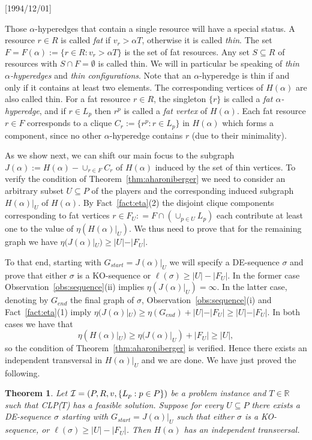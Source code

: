 \NeedsTeXFormat{LaTeX2e}[1994/12/01]\documentclass[letterpaper, 11pt]{article}
\newtheorem{thm}{Theorem}[section]
\theoremstyle{definition}
\theoremstyle{remark}
\numberwithin{equation}{section}
\begin{document}
Those $\alpha$-hyperedges that contain a single resource will have a special status. 
A resource $r\in R$ is called {\em fat} if $v_r >
\alpha T$, otherwise it is called {\em thin}.
The set $F = F(\alpha) := \{ r\in R: v_r > \alpha T \}$ is the set of
fat resources. Any set $S\subseteq R$ of resources with $S\cap F =
\emptyset$ is called thin. We will in particular be speaking of {\em thin
  $\alpha$-hyperedges} and {\em thin configurations}.
Note that an $\alpha$-hyperedge is thin if and only if it contains at
least two elements. The corresponding vertices
of $H(\alpha)$ are also called thin. 
For a fat resource $r\in R$, the singleton $\{ r \}$ is called a {\em fat
$\alpha$-hyperedge}, and if $r\in L_p$ then 
$r^p$ is called a {\em fat vertex} of $H(\alpha)$. 
Each fat resource $r\in F$ corresponds to a clique $C_r :=
\{ r^p : r\in L_p \}$ in  $H(\alpha)$ which forms a component, since no other
$\alpha$-hyperedge contains $r$ (due to their minimality).

As we show next, we can shift our main focus to the subgraph
$J(\alpha) := H(\alpha)- \cup_{r\in F} C_r$ of $H(\alpha)$
induced by the set of thin vertices.  
To verify the condition  of Theorem~\ref{thm:aharoniberger} we need to
consider an arbitrary subset $U\subseteq P$ of the players and 
the corresponding induced subgraph $H(\alpha)|_U$ of $H(\alpha)$.
By Fact~\ref{fact:eta}(2) the disjoint clique components corresponding to fat
vertices $r\in F_U : = F\cap (\cup_{p\in U} L_p)$ each contribute at least one to the
value of $\eta(H(\alpha)|_U)$. 
We thus need to prove that for the remaining
graph we have $\eta (J(\alpha)|_U) \geq |U|-|F_U|$.

To that end, starting with $G_{start}=J(\alpha)|_U$ we will specify a 
DE-sequence $\sigma$ and prove that either $\sigma$ is a KO-sequence
or $\ell(\sigma) \ge |U|-|F_U|$. In the former case
Observation~\ref{obs:sequence}(ii) implies
$\eta (J(\alpha)|_U) = \infty$. In the latter case, denoting by $G_{end}$ the final graph of $\sigma$,  Observation~\ref{obs:sequence}(i) and Fact~\ref{fact:eta}(1) imply
$\eta (J(\alpha)|_U) \geq \eta(G_{end}) + |U|-|F_U| \geq |U|-|F_U|$.
In both cases we have that $$\eta(H(\alpha)|_U) \geq \eta (J(\alpha)|_U)
+ |F_U| \geq |U|,$$
so the condition of Theorem~\ref{thm:aharoniberger}
is verified. Hence there exists an independent transversal in
$H(\alpha)|_U$ and we are done.
We have just proved the following.
\begin{thm}\label{thm:diet}
  Let ${\cal I} = ( P ,R, v, \{ L_p: p\in P \})$ be a problem instance
  and $T \in \mathbb{R}$ such that CLP($T$) has a feasible solution. 
 Suppose for every $U\subseteq P$ there exists a
 DE-sequence $\sigma$ starting with
  $G_{start}=J(\alpha)|_U$ such that either $\sigma$ is a KO-sequence, or
  $\ell(\sigma)\geq |U|-|F_U|$. Then $H(\alpha)$ has an independent
  transversal.
\end{thm}
  
\end{document}
